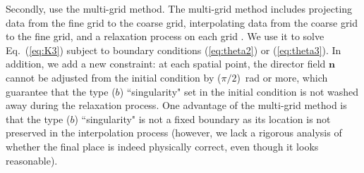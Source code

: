 \documentclass[nottitlepage]{article}
\begin{document}
Secondly, use the multi-grid method. The multi-grid method includes projecting data from the fine grid to the coarse grid, interpolating data from the coarse grid to the fine grid, and a relaxation process on each grid \cite{press}. We use it to solve Eq.~(\ref{eq:K3}) subject to boundary conditions (\ref{eq:theta2}) or (\ref{eq:theta3}). In addition, we add a new constraint: at each spatial point, the director field $\mathbf{n}$ cannot be adjusted from the initial condition by ($\pi/2$)~rad or more, which guarantee that the type ($b$) ``singularity" set in the initial condition is not washed away during the relaxation process. One advantage of the multi-grid method is that the type ($b$) ``singularity" is not a fixed boundary as its location is not preserved in the interpolation process (however, we lack a rigorous analysis of whether the final place is indeed physically correct, even though it looks reasonable).   %




\end{document}
